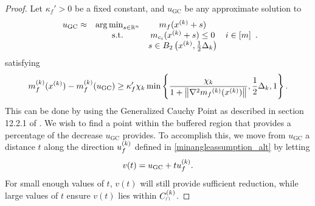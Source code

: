 \begin{proof}

Let $\kappa_f' > 0$ be a fixed constant, and $u_{\textrm{GC}}$ be any approximate solution to 
\begin{align*}
\begin{array}{cccc}
u_{\textrm{GC}} \approx & \operatorname*{arg\,min}_{s \in \mathbb R^n} & m_{f}(x^{(k)} + s) & \\
& \textrm{s.t.} & m_{c_i}(x^{(k)} + s) \le 0 & i \in [m]\\
& & s \in B_2\left(x^{(k)}, \frac 1 2 \Delta_k\right) & \\
\end{array}.
\end{align*}
satisfying
\begin{align}
\label{what_ugc_satisfies}
m_f^{(k)}(x^{(k)}) - m_f^{(k)}(u_{\textrm{GC}}) \ge \kappa_f' \chi_k \min\left\{ \frac{\chi_k}{1+\left\|\nabla^2 {{m}_f}^{(k)}(x^{(k)})\right\|}, \frac 1 2 \Delta_k, 1 \right\}.
\end{align}
This can be done by using the Generalized Cauchy Point as described in section 12.2.1 of \cite{Conn:2000:TM:357813}.
We wish to find a point within the buffered region that provides a percentage of the decrease $u_{\textrm{GC}}$ provides.
To accomplish this, we move from $u_{\textrm{GC}}$ a distance $t$ along the direction ${u^{(k)}_f}$ defined in \cref{minangleassumption_alt} by letting 
\begin{align*}
v(t) = u_{\textrm{GC}} + t {u^{(k)}_f}.
\end{align*}
For small enough values of $t$, $v(t)$ will still provide sufficient reduction,
while large values of $t$ ensure $v(t)$ lies within ${C^{(k)}_{\cap}}$.


\end{proof}
